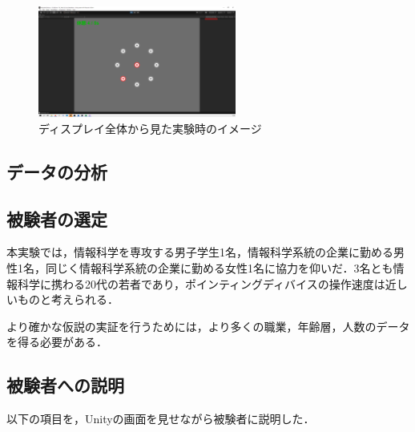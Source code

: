 \documentclass[a4paper, papersize, titlepage]{jsarticle}
\begin{document}
\begin{multicols}{2}
\begin{figure}[H]
 \centering
   \includegraphics[width=65mm]{exe_window.png}
 \caption{ディスプレイ全体から見た実験時のイメージ}
 \label{exe_window}
\end{figure}
\noindent

\subsection{データの分析}



\subsection{被験者の選定}
本実験では，情報科学を専攻する男子学生1名，情報科学系統の企業に勤める男性1名，同じく情報科学系統の企業に勤める女性1名に協力を仰いだ．3名とも情報科学に携わる20代の若者であり，ポインティングディバイスの操作速度は近しいものと考えられる．

より確かな仮説の実証を行うためには，より多くの職業，年齢層，人数のデータを得る必要がある．

\subsection{被験者への説明}

以下の項目を，Unityの画面を見せながら被験者に説明した．


\end{multicols}
\end{document}
